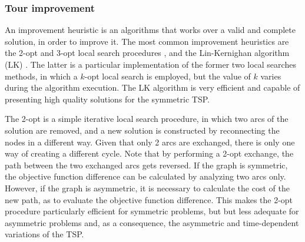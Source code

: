 \subsubsection{Tour improvement}
\label{sec:local_search}
An improvement heuristic is an algorithms that works over a valid and complete solution, in order to improve it. The most common improvement heuristics are the 2-opt and 3-opt local search procedures \cite{lkh_original}, and the Lin-Kernighan algorithm (LK) . The latter is a particular implementation of the former two local searches methods, in which a $k$-opt local search is employed, but the value of $k$ varies during the algorithm execution. The LK algorithm is very efficient and capable of presenting high quality solutions for the symmetric TSP.

The 2-opt is a simple iterative local search procedure, in which two arcs of the solution are removed, and a new solution is constructed by reconnecting the nodes in a different way. Given that only 2 arcs are exchanged, there is only one way of creating a different cycle. Note that by performing a 2-opt exchange, the path between the two exchanged arcs gets reversed. If the graph is symmetric, the objective function difference can be calculated by analyzing two arcs only. However, if the graph is asymmetric, it is necessary to calculate the cost of the new path, as to evaluate the objective function difference. This makes the 2-opt procedure particularly efficient for symmetric problems, but but less adequate for asymmetric problems and, as a consequence, the asymmetric and time-dependent variations of the TSP. 




